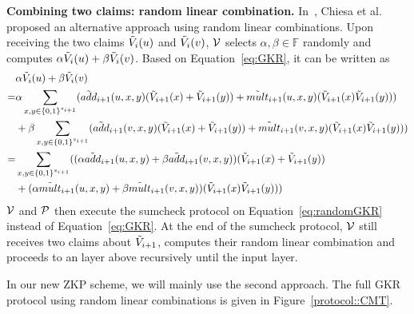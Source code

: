 \smallskip\noindent\textbf{Combining two claims: random linear combination.}  In~\cite{zksumcheck}, Chiesa et al. proposed an alternative approach using random linear combinations. Upon receiving the two claims $\tV_i(u)$ and $\tV_i(v)$, $\V$ selects $\alpha, \beta\in\mathbb{F}$ randomly and computes $\alpha\tV_i(u)+\beta\tV_i(v)$. Based on Equation~\ref{eq:GKR}, it can be written as
\begin{align}\label{eq:randomGKR}
&\alpha\tV_i(u)+\beta\tV_i(v)\nonumber\\
=&\alpha\sum_{x, y \in\binary^{s_{i+1}}}(\tadd_{i+1}(u,x,y)(\tV_{i+1}(x)+\tV_{i+1}(y))+\tmult_{i+1}(u,x,y)(\tV_{i+1}(x)\tV_{i+1}(y)))\nonumber\\
&+\beta\sum_{x, y \in\binary^{s_{i+1}}}(\tadd_{i+1}(v,x,y)(\tV_{i+1}(x)+\tV_{i+1}(y))+\tmult_{i+1}(v,x,y)(\tV_{i+1}(x)\tV_{i+1}(y)))\nonumber\\
=&\sum_{x, y \in\binary^{s_{i+1}}}((\alpha\tadd_{i+1}(u,x,y)+\beta\tadd_{i+1}(v,x,y))(\tV_{i+1}(x)+\tV_{i+1}(y))\nonumber\\
&+(\alpha\tmult_{i+1}(u,x,y)+\beta\tmult_{i+1}(v,x,y))(\tV_{i+1}(x)\tV_{i+1}(y)))
\end{align}
$\V$ and $\P$ then execute the sumcheck protocol on Equation~\ref{eq:randomGKR} instead of Equation~\ref{eq:GKR}. At the end of the sumcheck protocol, $\V$ still receives two claims about $\tV_{i+1}$, computes their random linear combination and proceeds to an layer above recursively until the input layer.

In our new ZKP scheme, we will mainly use the second approach. The full GKR protocol using random linear combinations is given in Figure~\ref{protocol::CMT}. 

